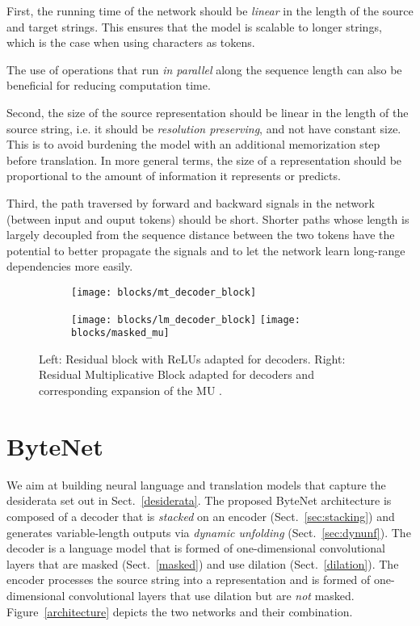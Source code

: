 \documentclass{article}
\begin{document}
First, the running time of the network should be \emph{linear} in the length of the source and target strings. 
This ensures that the model is scalable to longer strings, which is the case when using characters as tokens.

The use of operations that run \emph{in parallel} along the sequence length can also be beneficial for reducing computation time.

Second, the size of the source representation should be linear in the length of the source string, i.e. it should be \emph{resolution preserving}, and not have constant size. This is to avoid burdening the model with an additional memorization step before translation. In more general terms, the size of a representation should be proportional to the amount of information it represents or predicts. 

Third, the path traversed by forward and backward signals in the network (between input and ouput tokens) should be short.
Shorter paths whose length is largely decoupled from the sequence distance between the two tokens have the potential to better propagate the signals \citep{chapter-gradient-flow-2001} and to let the network learn long-range dependencies more easily. 




\begin{figure}[t]
    \centering
    \begin{subfigure}{}
        \texttt{[image: blocks/mt\_decoder\_block]}
    \end{subfigure}\hspace{1cm}
    \begin{subfigure}{}
        \texttt{[image: blocks/lm\_decoder\_block]}
        \hspace{.25cm}
        \texttt{[image: blocks/masked\_mu]}
    \end{subfigure}
    \caption{Left: Residual block with ReLUs \citep{DBLP:journals/corr/HeZR016} adapted for decoders. Right: Residual Multiplicative Block adapted for decoders and corresponding expansion of the MU \citep{vpn}.}
    \label{fig:residual}
\vspace{-0.5cm}
\end{figure}


\section{ByteNet}
\label{bytenet}
We aim at building neural language and translation models that capture the desiderata set out in Sect.~\ref{desiderata}. The proposed ByteNet architecture is composed of a decoder that is \emph{stacked} on an encoder (Sect.~\ref{sec:stacking}) and generates variable-length outputs via \emph{dynamic unfolding} (Sect.~\ref{sec:dynunf}). The decoder is a language model that is formed of one-dimensional convolutional layers that are masked (Sect.~\ref{masked}) and use dilation (Sect.~\ref{dilation}).  The encoder processes the source string into a representation and is formed of one-dimensional convolutional layers that use dilation but are \emph{not} masked. Figure~\ref{architecture} depicts the two networks and their combination. 
\end{document}

